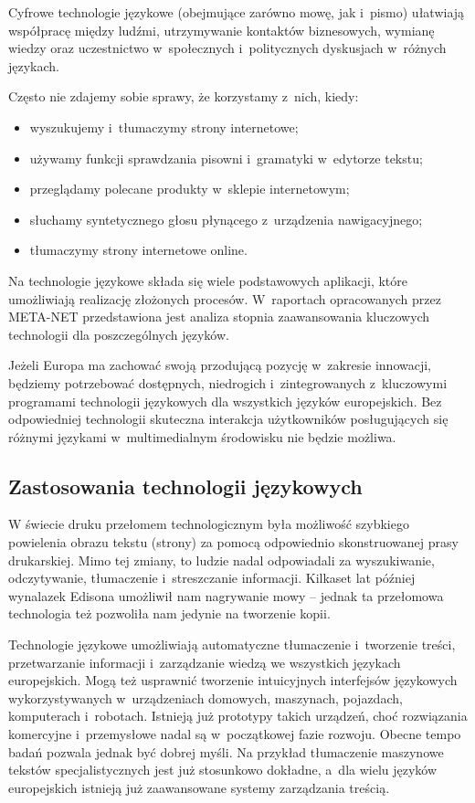 \begin{multicols}{2}
Cyfrowe technologie językowe (obejmujące zarówno mowę, jak
i~pismo) ułatwiają współpracę między ludźmi, utrzymywanie
kontaktów biznesowych, wymianę wiedzy oraz uczestnictwo
w~społecznych i~politycznych dyskusjach w~różnych językach. 

Często nie zdajemy sobie sprawy, że korzystamy z~nich, kiedy:
\begin{itemize} \item wyszukujemy i~tłumaczymy strony internetowe;
\item używamy funkcji sprawdzania pisowni i~gramatyki w~edytorze
tekstu; \item przeglądamy polecane produkty w~sklepie internetowym;
\item słuchamy syntetycznego głosu płynącego z~urządzenia
nawigacyjnego; \item tłumaczymy strony internetowe online.
\end{itemize} 

Na technologie językowe składa się wiele podstawowych aplikacji,
które umożliwiają realizację złożonych procesów. W~raportach
opracowanych przez META-NET przedstawiona jest analiza stopnia
zaawansowania kluczowych technologii dla poszczególnych języków. 


Jeżeli Europa ma zachować swoją przodującą pozycję w~zakresie
innowacji, będziemy potrzebować dostępnych, niedrogich
i~zintegrowanych z~kluczowymi programami technologii językowych dla
wszystkich języków europejskich. Bez odpowiedniej technologii
skuteczna interakcja użytkowników posługujących się różnymi
językami w~multimedialnym środowisku nie będzie możliwa. 

\subsection{Zastosowania technologii językowych} 

W świecie druku przełomem technologicznym była możliwość
szybkiego powielenia obrazu tekstu (strony) za pomocą odpowiednio
skonstruowanej prasy drukarskiej. Mimo tej zmiany, to ludzie nadal
odpowiadali za wyszukiwanie, odczytywanie, tłumaczenie i~streszczanie
informacji. Kilkaset lat później wynalazek Edisona umożliwił nam
nagrywanie mowy – jednak ta przełomowa technologia też pozwoliła
nam jedynie na tworzenie kopii. 

Technologie językowe umożliwiają automatyczne tłumaczenie
i~tworzenie treści, przetwarzanie informacji i~zarządzanie wiedzą
we wszystkich językach europejskich. Mogą też usprawnić tworzenie
intuicyjnych interfejsów językowych wykorzystywanych w~urządzeniach
domowych, maszynach, pojazdach, komputerach i~robotach. Istnieją już
prototypy takich urządzeń, choć rozwiązania komercyjne
i~przemysłowe nadal są w~początkowej fazie rozwoju. Obecne tempo
badań pozwala jednak być dobrej myśli. Na przykład tłumaczenie
maszynowe tekstów specjalistycznych jest już stosunkowo dokładne,
a~dla wielu języków europejskich istnieją już zaawansowane systemy
zarządzania treścią. 


\end{multicols}
